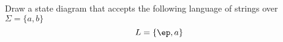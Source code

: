Draw a state diagram that accepts the following
language of strings over $\Sigma =
\{ a, b \}$ 
\[
L = \{\ep, a\}
\]
